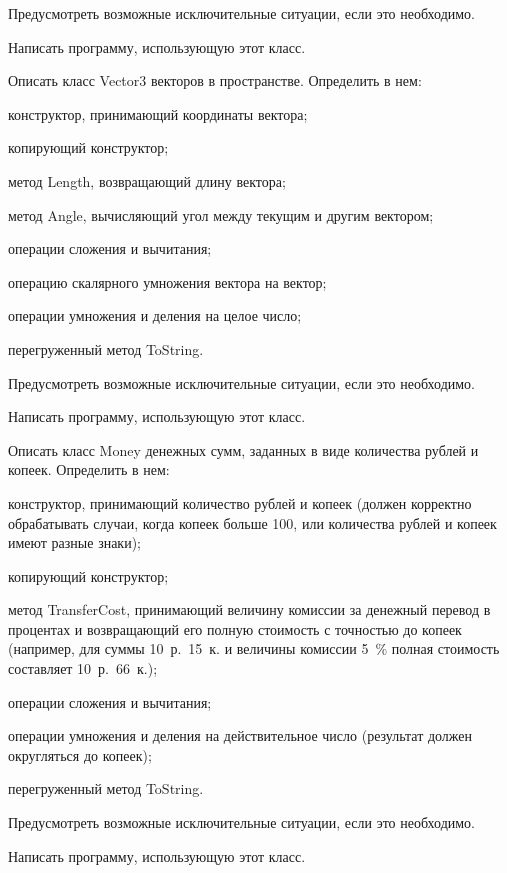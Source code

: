Предусмотреть возможные исключительные ситуации, если это необходимо.

Написать программу, использующую этот класс.

\task Описать класс Vector3 векторов в пространстве. Определить в нем:
\begin{itemize*}
\item конструктор, принимающий координаты вектора;
\item копирующий конструктор;
\item метод Length, возвращающий длину вектора;
\item метод Angle, вычисляющий угол между текущим и другим вектором;
\item операции сложения и вычитания;
\item операцию скалярного умножения вектора на вектор;
\item операции умножения и деления на целое число;
\item перегруженный метод ToString.
\end{itemize*}

Предусмотреть возможные исключительные ситуации, если это необходимо.

Написать программу, использующую этот класс.

\task Описать класс Money денежных сумм, заданных в виде количества рублей и копеек.
 Определить в нем:
\begin{itemize*}
\item конструктор, принимающий количество рублей и копеек (должен
  корректно обрабатывать случаи, когда копеек больше 100, или
  количества рублей и копеек имеют разные знаки);
\item копирующий конструктор;
\item метод TransferCost, принимающий величину комиссии за денежный
  перевод в процентах и возвращающий его полную стоимость с точностью
  до копеек (например, для суммы 10~р.~15~к. и величины комиссии 5~\%
  полная стоимость составляет 10~р.~66~к.);
\item операции сложения и вычитания;
\item операции умножения и деления на действительное число (результат
  должен округляться до копеек);
\item перегруженный метод ToString.
\end{itemize*}

Предусмотреть возможные исключительные ситуации, если это необходимо.

Написать программу, использующую этот класс.


